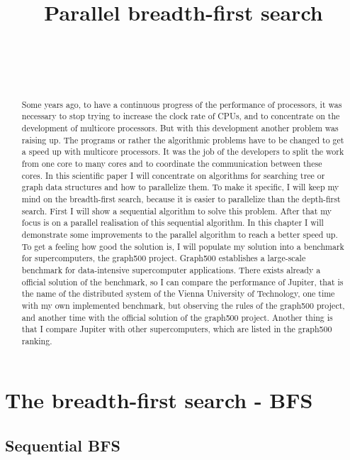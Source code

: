 \documentclass[11pt,a4paper]{article}
\title{Parallel breadth-first search}
\author{
 \authorname{Alexander Gallauner} \\
 \studentnumber{1026090} \\
 \curriculum{534} \\
 \email{e1026090@student.tuwien.ac.at}
}
\begin{document}
\maketitle
\begin{abstract}
Some years ago, to have a continuous progress of the performance of processors, it was necessary to stop trying to increase the clock rate of CPUs, and to concentrate on the development of multicore processors. But with this development another problem was raising up. The programs or rather the algorithmic problems have to be changed to get a speed up with multicore processors. It was the job of the developers to split the work from one core to many cores and to coordinate the communication between these cores. In this scientific paper I will concentrate on algorithms for searching tree or graph data structures and how to parallelize them. To make it specific, I will keep my mind on the breadth-first search, because it is easier to parallelize than the depth-first search. First I will show a sequential algorithm to solve this problem. After that my focus is on a parallel realisation of this sequential algorithm. In this chapter I will demonstrate some improvements to the parallel algorithm to reach a better speed up.
To get a feeling how good the solution is, I will populate my solution into a benchmark for supercomputers, the graph500 project. Graph500 establishes a large-scale benchmark for data-intensive supercomputer applications. There exists already a official solution of the benchmark, so I can compare the performance of Jupiter, that is the name of the distributed system of the Vienna University of Technology, one time with my own implemented benchmark, but observing the rules of the graph500 project, and another time with the official solution of the graph500 project. Another thing is that I compare Jupiter with other supercomputers, which are listed in the graph500 ranking.
\end{abstract}

\clearpage

\section{The breadth-first search - BFS}
\label{sec:breadth-first search}

\subsection{Sequential BFS}
\label{sec:sequential-bfs}
\end{document}
